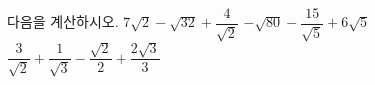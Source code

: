 다음을 계산하시오.
 $7\sqrt{2}-\sqrt{32}+\dfrac{4}{\sqrt{2}}$
 $-\sqrt{80}-\dfrac{15}{\sqrt{5}}+6\sqrt{5}$
 $\dfrac{3}{\sqrt{2}}+\dfrac{1}{\sqrt{3}}-\dfrac{\sqrt{2}}{2}+\dfrac{2\sqrt{3}}{3}$
